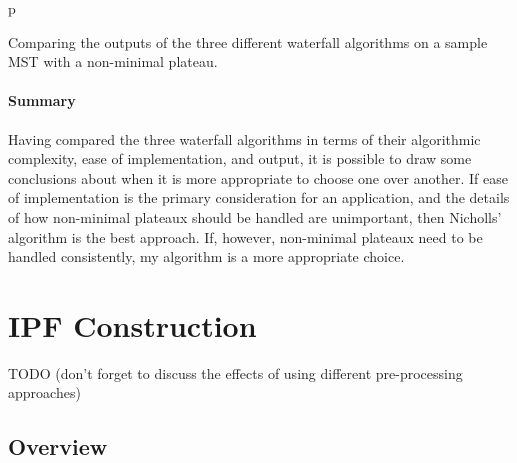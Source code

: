 \begin{stusubfig}{p}
	\hspace{4mm}%
\caption{Comparing the outputs of the three different waterfall algorithms on a sample MST with a non-minimal plateau.}
\label{fig:segmentation-waterfall-comparison}
\end{stusubfig}

\paragraph{Summary}

Having compared the three waterfall algorithms in terms of their algorithmic complexity, ease of implementation, and output, it is possible to draw some conclusions about when it is more appropriate to choose one over another. If ease of implementation is the primary consideration for an application, and the details of how non-minimal plateaux should be handled are unimportant, then Nicholls' algorithm is the best approach. If, however, non-minimal plateaux need to be handled consistently, my algorithm is a more appropriate choice.

\clearpage

\section{IPF Construction}
\label{sec:segmentation-ipfconstruction}

TODO (don't forget to discuss the effects of using different pre-processing approaches)

\subsection{Overview}

